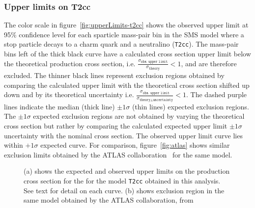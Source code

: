 \subsubsection{Upper limits on T2cc}
The color scale in figure~\ref{fig:upperLimits-t2cc} shows the observed upper 
limit at 95\% confidence level for each sparticle mass-pair bin in the SMS 
model where a stop particle decays to a charm quark and a neutralino (\texttt{T2cc}). 
The mass-pair bins left of the thick black curve have a calculated cross 
section upper limit below the theoretical production cross section, 
i.e. $\frac{\sigma_{\texttt{obs. upper limit}}}{\sigma_{\texttt{theory}}} < 1$, and
are therefore excluded. The thinner black lines represent exclusion regions obtained by
comparing the calculated upper limit with the theoretical cross section shifted up down 
and by its theoretical uncertainty i.e. 
$\frac{\sigma_{\texttt{obs. upper limit}}}{\sigma_{\texttt{theory} \pm \texttt{uncertainty}}} < 1$.
The dashed purple lines indicate the median (thick line) $\pm 1 \sigma$ 
(thin lines) expected exclusion regions. The $\pm 1 \sigma$ expected exclusion 
regions are not obtained by varying the theoretical cross section but rather 
by comparing the calculated expected upper limit $\pm 1 \sigma$ uncertainty
with the nominal cross section. The observed upper limit curve lies within
$+1 \sigma$ expected curve. For comparison, figure~\ref{fig:atlas} shows similar
exclusion limits obtained by the ATLAS collaboration~\cite{Aad:2008zzm} for the same 
model. 

\begin{figure}[h!]
  \begin{center}
    \caption{(a) shows the expected and observed upper limits on the production cross section 
    for the for the model \texttt{T2cc} obtained in this analysis. See text for detail on each curve.
    (b) shows exclusion region in the same model obtained by the ATLAS collaboration, from~\cite{Aad:2014nra}}
  \end{center}
\end{figure}

